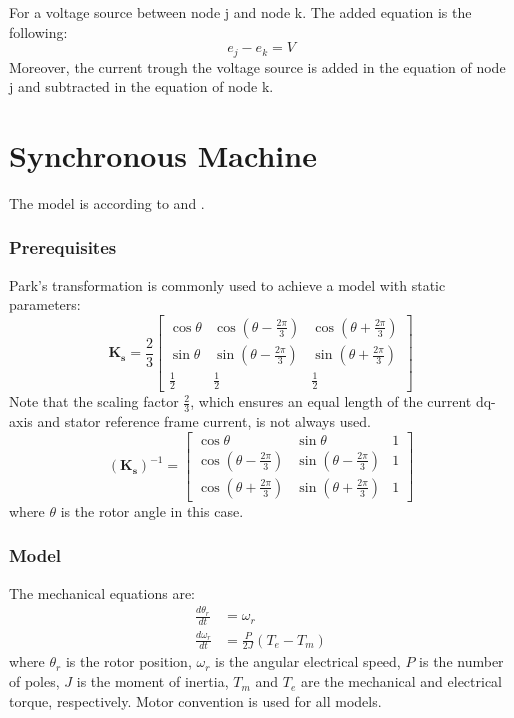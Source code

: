 For a voltage source between node j and node k. The added equation is the following:
\begin{equation}
e_j - e_k = V
\end{equation}
Moreover, the current trough the voltage source is added in the equation of node j and subtracted in the equation of node k.





\section{Synchronous Machine}

The model is according to \cite{wang2010methods} and \cite{kundur1994power}. 

\subsubsection{Prerequisites}
Park's transformation is commonly used to achieve a model with static parameters:
%
\begin{equation}
\mathbf{K_s} = \frac{2}{3}
 \begin{bmatrix} 
  \cos \theta & \cos(\theta-\frac{2\pi}{3}) & \cos(\theta+\frac{2\pi}{3}) \\
  \sin \theta & \sin(\theta-\frac{2\pi}{3}) & \sin(\theta+\frac{2\pi}{3}) \\
  \frac{1}{2} & \frac{1}{2} & \frac{1}{2}
 \end{bmatrix}
\end{equation}
%
Note that the scaling factor $\frac{2}{3}$, which ensures an equal length of the current dq-axis and stator reference frame current, is not always used. 
%
\begin{equation}
(\mathbf{K_s})^{-1} = 
 \begin{bmatrix} 
  \cos \theta & \sin \theta & 1 \\
  \cos(\theta-\frac{2\pi}{3}) & \sin(\theta-\frac{2\pi}{3}) & 1 \\
  \cos(\theta+\frac{2\pi}{3}) & \sin(\theta+\frac{2\pi}{3}) & 1
 \end{bmatrix}
\end{equation}
%
where $\theta$ is the rotor angle in this case.

\subsubsection{Model}

The mechanical equations are:
%
\begin{align}
\frac{d\theta_r}{dt} &= \omega_r \label{eq:d_theta} \\
\frac{d\omega_r}{dt} &= \frac{P}{2J} (T_e-T_m) \label{eq:d_omega}
\end{align}
%
where $\theta_r$ is the rotor position, $\omega_r$ is the angular electrical speed, $P$ is the number of poles, $J$ is the moment of inertia, $T_m$ and $T_e$ are the mechanical and electrical torque, respectively. Motor convention is used for all models. 

